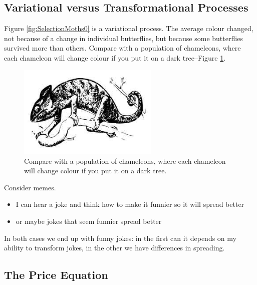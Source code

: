 \documentclass[]{article}
\begin{document}
\subsection{Variational versus Transformational Processes}
Figure \ref{fig:SelectionMoths0} is a variational process. The average colour changed, not because of a change in individual butterflies, but because some butterflies survived more than others. Compare with a population of chameleons, where each chameleon will change colour if you put it on a dark tree--Figure \ref{fig:chamelion}.
\begin{figure}[H]
	\begin{center}
		\caption[ Compare with a population of chameleons]{ Compare with a population of chameleons, where each chameleon will change colour if you put it on a dark tree.}\label{fig:chamelion}
		\includegraphics[width=0.6\textwidth]{chamelion}
	\end{center}
\end{figure}

Consider memes.
\begin{itemize}
	\item I can hear a joke and think how to make it funnier so it will spread better
	\item or maybe jokes that seem funnier spread better
\end{itemize}

In both cases we end up with funny jokes: in the first can it depends on my ability to transform jokes, in the other we have differences in spreading.

\subsection{The Price Equation}
\end{document}

